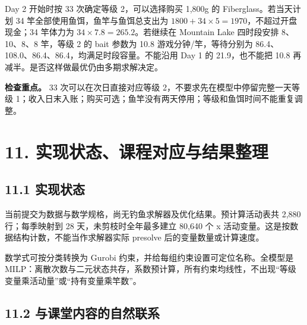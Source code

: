 \documentclass[11pt,a4paper]{article}
\begin{document}
Day 2 开始时按 33 次确定等级 2，可以选择购买 1,800g 的 Fiberglass。若当天计划 34 竿全部使用鱼饵，鱼竿与鱼饵总支出为 $1800+34\times5=1970$，不超过开盘现金；34 竿体力为 $34\times7.8=265.2$。若继续在 Mountain Lake 四时段安排 8、10、8、8 竿，等级 2 的 bait 参数为 10.8 游戏分钟/竿，等待分别为 86.4、108.0、86.4、86.4，均满足时段容量。不能沿用 Day 1 的 21.9，也不能把 10.8 再减半。是否这样做最优仍由多期求解决定。\par

\textbf{检查重点。} 33 次可以在次日直接对应等级 2，不要求先在模型中停留完整一天等级 1；收入日末入账；购买可选；鱼竿没有两天停用；等级和鱼饵时间不能重复调整。\par

\section*{\color{modelblue}11. 实现状态、课程对应与结果整理}

\subsection*{11.1 实现状态}

当前提交为数据与数学规格，尚无钓鱼求解器及优化结果。预计算活动表共 2,880 行；每季映射到 28 天，未剪枝时全年最多建立 80,640 个 x 活动变量。这是按数据结构计数，不能当作求解器实际 presolve 后的变量数量或计算速度。\par

数学式可按分类转换为 Gurobi 约束，并给每组约束设置可定位名称。全模型是 MILP：离散次数与二元状态共存，系数预计算，所有约束均线性，不出现“等级变量乘活动量”或“持有变量乘竿数”。\par

\subsection*{11.2 与课堂内容的自然联系}
\end{document}
